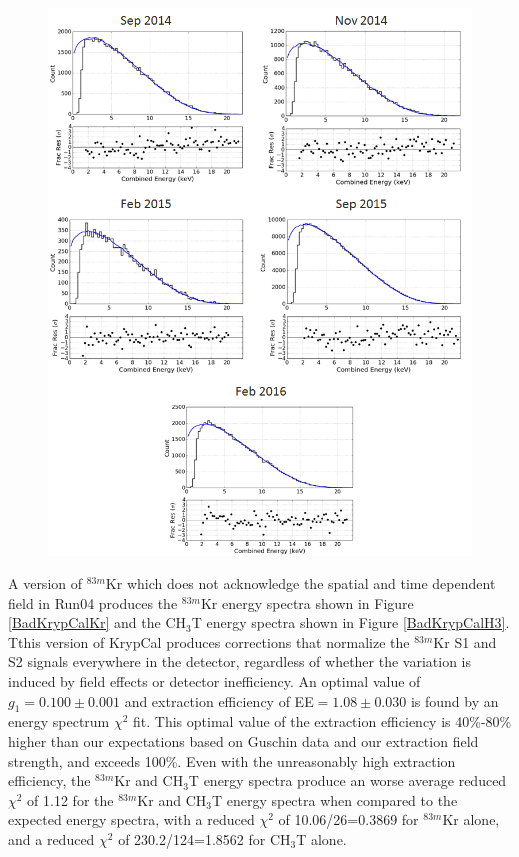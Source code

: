 \documentclass[a4paper,12pt]{article}
\begin{document}
{\begin{figure} [h!]
\includegraphics[scale=0.7]{Run04Corrections/KrypCal_2p22_AllCH3TEnergy.png}
 \label{Kr2p22_H3E}
\end{figure}


A version of $^{83m}$Kr which does not acknowledge the spatial and time dependent field in Run04 produces the $^{83m}$Kr energy spectra shown in Figure \ref{BadKrypCalKr} and the CH$_3$T energy spectra shown in Figure \ref{BadKrypCalH3}.  Tthis version of KrypCal produces corrections that normalize the $^{83m}$Kr S1 and S2 signals everywhere in the detector, regardless of whether the variation is induced by field effects or detector inefficiency. An optimal value of $g_1=0.100 \pm 0.001$ and extraction efficiency of EE$=1.08 \pm 0.030$ is found by an energy spectrum $\chi^2$ fit.  This optimal value of the extraction efficiency is 40\%-80\% higher than our expectations based on Guschin data and our extraction field strength, and exceeds 100\%.  Even with the unreasonably high extraction efficiency, the $^{83m}$Kr and CH$_3$T energy spectra produce an worse average reduced $\chi^2$ of 1.12 for the $^{83m}$Kr and CH$_3$T energy spectra when compared to the expected energy spectra, with a reduced $\chi^2$ of 10.06/26=0.3869 for $^{83m}$Kr alone, and a reduced $\chi^2$ of 230.2/124=1.8562 for CH$_3$T alone. 

}
\end{document}
